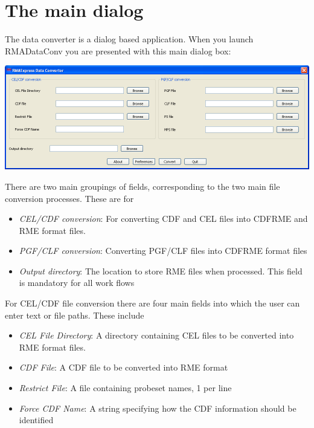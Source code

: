 \documentclass[11pt]{report}
\begin{document}
\section{The main dialog}

The data converter is a dialog based application. When you launch RMADataConv you are presented with this main dialog box: 
\begin{center}
\includegraphics[scale=0.45]{dataconvertor}
\end{center}

There are two main groupings of fields, corresponding to the two main file conversion processes. These are for
\begin{itemize}
\item{\it CEL/CDF conversion}: For converting CDF and CEL files into CDFRME and RME format files.
\item{\it PGF/CLF conversion}: Converting PGF/CLF files into CDFRME format files
\end{itemize}

\begin{itemize}
\item {\it Output directory}: The location to store RME files when processed. This field is mandatory for all work flows
\end{itemize}

For CEL/CDF file conversion there are four main fields into which the user can enter text or file paths. These include
\begin{itemize}
\item {\it CEL File Directory}: A directory containing CEL files to be converted into RME format files.
\item {\it CDF File}: A CDF file to be converted into RME format
\item {\it Restrict File}: A file containing probeset names, 1 per line
\item {\it Force CDF Name}: A string specifying how the CDF information should be identified 
\end{itemize}
\end{document}

